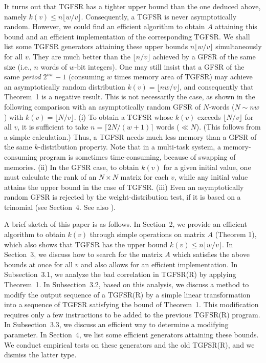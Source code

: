It turns out that TGFSR has a tighter upper bound than the one deduced
above,
namely $k(v)\leq n\lfloor w/v \rfloor$.
Consequently, a TGFSR is never asymptotically random.
However, we could find an efficient algorithm 
to obtain $A$ attaining this bound and an efficient implementation
of the corresponding TGFSR. 
We shall list
some TGFSR generators attaining these upper bounds $n\lfloor w/v\rfloor$
simultaneously for all $v$. 
They are much better
than the
$\lfloor n/v \rfloor$
achieved by a GFSR of the same size
(i.e., $n$ words of $w$-bit integers).
One may still insist that
a GFSR of the same {\em period} $2^{nw}-1$
(consuming $w$ times memory area of TGFSR)
may achieve an asymptotically random distribution $k(v)=\lfloor nw / v \rfloor$,
and consequently that
Theorem~1 is a negative result.
This is not necessarily the case,
as shown in the following comparison with
an asymptotically random GFSR 
of $N$-words ($N \sim nw$) with $k(v)=\lfloor N/v \rfloor$.
\newline
(i)
To obtain a TGFSR whose $k(v)$ exceeds $\lfloor N/v \rfloor$
for all $v$, 
it is sufficient to take $n=\lceil 2N/(w+1) \rceil$ words ($\ll N$).
(This follows from a simple calculation.)
Thus, a TGFSR needs
much less memory than a GFSR of the same $k$-distribution property.
Note that in a multi-task system,
a memory-consuming program is sometimes time-consuming,
because of swapping of memories.
\newline
(ii)
In the GFSR case, to obtain $k(v)$ for a given initial value, 
one must calculate the rank of an $N\times N$ matrix
for each $v$,
while any initial value attains the upper bound
in the case of TGFSR.
\newline
(iii)
Even an asymptotically random GFSR 
is rejected by the weight-distribution test,
if it is based on a trinomial (see Section~4. See also \cite{matsumoto}).

A brief sketch of this paper is as follows.
In Section~2, we provide an efficient algorithm to obtain $k(v)$ through
simple operations on matrix $A$ (Theorem 1),
which also shows that TGFSR has the upper bound 
$k(v)\leq n\lfloor w/v \rfloor$.
In Section~3, we discuss
how to search for the matrix $A$ which satisfies the above bounds
at once for all $v$
and also allows for an efficient implementation.
In Subsection~3.1, 
we analyze the bad correlation in TGFSR(R)
by applying Theorem~1.
In Subsection~3.2, based on this analysis,
we discuss a method to modify the output sequence of a TGFSR(R)
by a simple linear transformation into a sequence of TGFSR
satisfying the bound of Theorem~1. This modification requires only
a few instructions to be added to the previous TGFSR(R) program.
In Subsection~3.3, we discuss an efficient way to determine a modifying
parameter.
In Section~4, 
we list some efficient generators attaining these bounds.
We conduct empirical tests on these generators and the 
old TGFSR(R), and we dismiss the latter type. 

